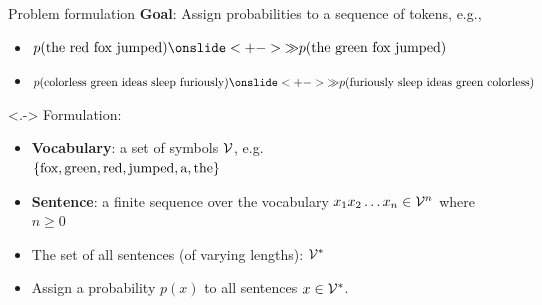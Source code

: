 \documentclass[usenames,dvipsnames,notes,11pt,aspectratio=169,hyperref={colorlinks=true, linkcolor=blue}]{beamer}
\newcommand{\pdfnote}[1]{}
\begin{document}
\begin{frame}
    {Problem formulation}
    \textbf{Goal}: Assign probabilities to a sequence of tokens, e.g., \\
    \begin{itemize}[<+->]
        \item $p(\text{the red fox jumped})
            \onslide<+->{\gg} p(\text{the green fox jumped})$
        \item $p(\text{colorless green ideas sleep furiously})
            \onslide<+->{\gg} p(\text{furiously sleep ideas green colorless})$
    \end{itemize}

    \onslide<.->{
        Formulation:\\}
    \begin{itemize}[<+->]
        \item \textbf{Vocabulary}: a set of symbols $\mathcal{V}$, e.g.\\
            \indent $\left\{ \text{fox}, \text{green}, \text{red}, \text{jumped}, \text{a}, \text{the} \right\}$
        \item \textbf{Sentence}: a {finite} sequence over the vocabulary $x_1 x_2 \ldots x_n \in \mathcal{V}^n$ where $n\ge 0$ %
        \item The set of all sentences (of varying lengths): $\mathcal{V}^*$ 
        \item Assign a probability $p(x)$ to all sentences $x\in\mathcal{V}^*$. 
    \end{itemize}
    \pdfnote{
        red > green: green fox is very rare.
        Grammatically correct sentences is more likely than gibberish.
    }
    \pdfnote{
        Language models tell us how likely we'll encounter a sentence in English. 
        A common misconception is that low probability under an LM means ungrammatical text. However, a sentence can be rare due to many reasons, it could contain rare words, being ungrammatical, or doesn't make any sense. Low probability doesn't necessarily mean ungrammaticality.
    }
    \pdfnote{
        Today, our task is to model this distribution and estimate its params given a corpus.
    }
\end{frame}
\end{document}
